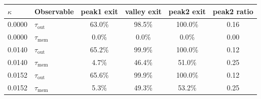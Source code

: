 \begin{tabular}{llcccc}
\toprule
$\kappa$ & Observable & peak1 exit & valley exit & peak2 exit & peak2 ratio \\
\midrule
0.0000 & $\tau_{\mathrm{out}}$ & 63.0\% & 98.5\% & 100.0\% & 0.16 \\
0.0000 & $\tau_{\mathrm{mem}}$ & 0.0\% & 0.0\% & 0.0\% & 0.00 \\
0.0140 & $\tau_{\mathrm{out}}$ & 65.2\% & 99.9\% & 100.0\% & 0.12 \\
0.0140 & $\tau_{\mathrm{mem}}$ & 4.7\% & 46.4\% & 51.0\% & 0.25 \\
0.0152 & $\tau_{\mathrm{out}}$ & 65.6\% & 99.9\% & 100.0\% & 0.12 \\
0.0152 & $\tau_{\mathrm{mem}}$ & 5.3\% & 49.3\% & 53.2\% & 0.25 \\
\bottomrule
\end{tabular}
